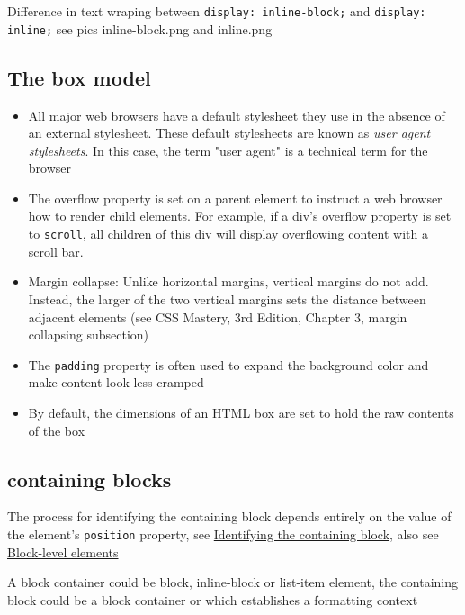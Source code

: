 \documentclass[a4paper, 12pt]{article}
\begin{document}
Difference in text wraping between \verb|display: inline-block;| and \verb|display: inline;| see pics inline-block.png and inline.png

\subsection{The box model}
\begin{itemize}

\item All major web browsers have a default stylesheet they use in the absence of an external stylesheet. These default stylesheets are known as \textit{user agent stylesheets}. In this case, the term "user agent" is a technical term for the browser

\item The overflow property is set on a parent element to instruct a web browser how to render child elements. For example, if a div's overflow property is set to \verb|scroll|, all children of this div will display overflowing content with a scroll bar.

\item Margin collapse: Unlike horizontal margins, vertical margins do not add. Instead, the larger of the two vertical margins sets the distance between adjacent elements (see CSS Mastery, 3rd Edition, Chapter 3, margin collapsing subsection)

\item The \verb|padding| property is often used to expand the background color and make content look less cramped

\item By default, the dimensions of an HTML box are set to hold the raw contents of the box

\end{itemize}

\subsection{containing blocks}
The process for identifying the containing block depends entirely on the value of the element's \verb|position| property, see \href{https://developer.mozilla.org/en-US/docs/Web/CSS/Containing_block#Identifying_the_containing_block}{Identifying the containing block}, also see \href{https://developer.mozilla.org/en-US/docs/Web/HTML/Block-level_elements}{Block-level elements}

A block container could be block, inline-block or list-item element, the containing block could be a block container or which establishes a formatting context
\end{document}
